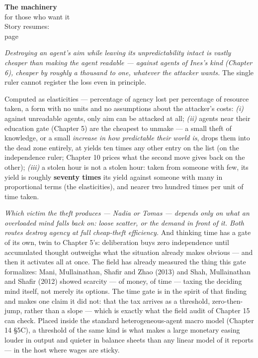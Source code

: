 \begin{machinery}{\textbf{The machinery}\\for those who want it\\[3pt]{\color{muted}Story resumes:\\page~\pageref{partIII}}}



\label{claim-7}

\noindent \emph{Destroying an agent's aim
while leaving its unpredictability intact is vastly cheaper than making
the agent readable --- against agents of Ines's kind (Chapter 6), cheaper
by roughly a thousand to one, whatever the attacker wants.} The single
ruler cannot register the loss even in principle.


\label{claim-8}

\noindent Computed as elasticities ---
percentage of agency lost per percentage of resource taken, a form with
no units and no assumptions about the attacker's costs:
\emph{(i)} against unreadable agents, only aim can be attacked at all;
\emph{(ii)} agents near their education gate (Chapter 5) are the cheapest
to unmake --- a small theft of knowledge, or a small \emph{increase in how
predictable their world is}, drops them into the dead zone entirely,
at yields ten times any other entry on the list (on the independence
ruler; Chapter 10 prices what the second move gives back on the other);
\emph{(iii)} a stolen hour is not a stolen hour: taken from someone with
few, its yield is roughly \textbf{seventy times} its yield against someone
with many in proportional terms (the elasticities), and nearer two
hundred times per unit of time taken.


\label{claim-9}

\noindent \emph{Which
victim the theft produces --- Nadia or Tomas --- depends only on what an
overloaded mind falls back on: loose scatter, or the demand in front of
it. Both routes destroy agency at full cheap-theft efficiency.} And
thinking time has a gate of its own, twin to Chapter 5's: deliberation
buys zero independence until accumulated thought outweighs what the
situation already makes obvious --- and then it activates all at once. The field has already measured the thing this gate formalizes: Mani, Mullainathan, Shafir and Zhao (2013) and Shah, Mullainathan and Shafir (2012) showed scarcity --- of money, of time --- taxing the deciding mind itself, not merely its options. The time gate is in the spirit of that finding and makes one claim it did not: that the tax arrives as a threshold, zero-then-jump, rather than a slope --- which is exactly what the field audit of Chapter 15 can check. Placed inside the standard heterogeneous-agent macro model (Chapter 14 §5C), a threshold of the same kind is what makes a large monetary easing louder in output and quieter in balance sheets than any linear model of it reports --- in the host where wages are sticky.


\end{machinery}

